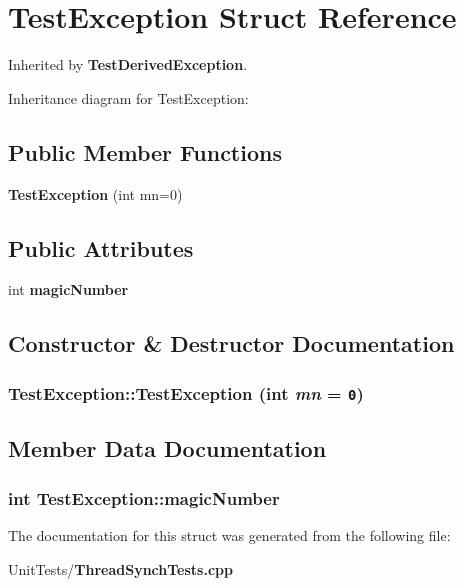 \section{Test\-Exception Struct Reference}
\label{struct_test_exception}
Inherited by {\bf Test\-Derived\-Exception}.

Inheritance diagram for Test\-Exception:\subsection*{Public Member Functions}
\begin{CompactItemize}
\item 
{\bf Test\-Exception} (int mn=0)
\end{CompactItemize}
\subsection*{Public Attributes}
\begin{CompactItemize}
\item 
int {\bf magic\-Number}
\end{CompactItemize}


\subsection{Constructor \& Destructor Documentation}
\subsubsection{\setlength{\rightskip}{0pt plus 5cm}Test\-Exception::Test\-Exception (int {\em mn} = {\tt 0})\hspace{0.3cm}{\tt  [inline]}}\label{struct_test_exception_41f758535ba878a141de29b8917fcf4a}




\subsection{Member Data Documentation}
\subsubsection{\setlength{\rightskip}{0pt plus 5cm}int {\bf Test\-Exception::magic\-Number}}\label{struct_test_exception_f5748728424547efb419b2299f072623}




The documentation for this struct was generated from the following file:\begin{CompactItemize}
\item 
Unit\-Tests/{\bf Thread\-Synch\-Tests.cpp}\end{CompactItemize}
